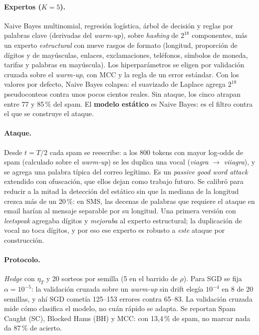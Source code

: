 \documentclass[10pt,twocolumn,a4paper]{article}
\newcommand{\etaT}{\eta_T}
\begin{document}
\paragraph{Expertos ($K = 5$).} Naive Bayes multinomial, regresión logística, árbol de decisión y
reglas por palabras clave (derivadas del \emph{warm-up}), sobre \emph{hashing} de $2^{18}$
componentes, más un experto \emph{estructural} con nueve rasgos de formato (longitud, proporción de
dígitos y de mayúsculas, enlaces, exclamaciones, teléfonos, símbolos de moneda, tarifas y palabras en
mayúscula). Los hiperparámetros se eligen por validación cruzada sobre el \emph{warm-up}, con MCC y
la regla de un error estándar. Con los valores por defecto, Naive Bayes colapsa: el suavizado de
Laplace agrega $2^{18}$ pseudoconteos contra unos pocos cientos reales. Sin ataque, los cinco atrapan
entre 77 y 85\,\% del spam. El \textbf{modelo estático} es Naive Bayes: es el filtro contra el que se
construye el ataque.

\paragraph{Ataque.} Desde $t = T/2$ cada spam se reescribe: a los 800 tokens con mayor log-odds de
spam (calculado sobre el \emph{warm-up}) se les duplica una vocal (\emph{viagra} $\to$
\emph{viiagra}), y se agrega una palabra típica del correo legítimo. Es un \emph{passive good word
attack}~\cite{lowd2005goodword} extendido con ofuscación, que ellos dejan como trabajo futuro. Se
calibró para reducir a la mitad la detección del estático sin que la mediana de la longitud crezca
más de un 20\,\%: en SMS, las decenas de palabras que requiere el ataque en email harían al mensaje
separable por su longitud. Una primera versión con \emph{leetspeak} agregaba dígitos y \emph{mejoraba} al experto
estructural; la duplicación de vocal no toca dígitos, y por eso ese experto es robusto a
\emph{este} ataque por construcción.

\paragraph{Protocolo.} \emph{Hedge} con $\etaT$ y 20 sorteos por semilla (5 en el barrido de $\rho$).
Para SGD se fija $\alpha = 10^{-5}$: la validación cruzada sobre un \emph{warm-up} sin drift elegía
$10^{-4}$ en 8 de 20 semillas, y ahí SGD cometía 125--153 errores contra 65--83. La validación
cruzada mide cómo clasifica el modelo, no cuán rápido se adapta. Se reportan Spam Caught (SC),
Blocked Hams (BH) y MCC: con 13,4\,\% de spam, no marcar nada da 87\,\% de acierto.
\end{document}
